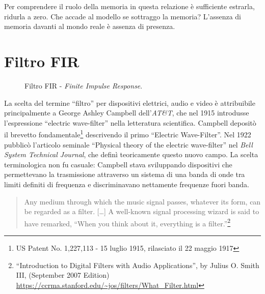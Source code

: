 Per comprendere il ruolo della memoria in questa relazione è sufficiente estrarla, ridurla a zero. Che accade al modello se sottraggo la memoria? L'assenza di memoria davanti al mondo reale è assenza di presenza.

\section{Filtro FIR}

\begin{figure}[htbp]
\begin{center}
\caption{Filtro FIR - \emph{Finite Impulse Response}.}
\label{slide7}
\end{center}
\end{figure}

La scelta del termine “filtro” per dispositivi elettrici, audio e video è
attribuibile principalmente a George Ashley Campbell dell'\emph{AT\&T}, che nel
1915 introdusse l'espressione “electric wave-filter” nella letteratura scientifica.
Campbell depositò il brevetto fondamentale\footnote{US Patent No. 1,227,113 - 15
luglio 1915, rilasciato il 22 maggio 1917} descrivendo il primo “Electric
Wave-Filter”. Nel 1922 pubblicò l'articolo seminale “Physical theory of the
electric wave-filter” nel \emph{Bell System Technical Journal}, che definì
teoricamente questo nuovo campo. La scelta terminologica non fu casuale:
Campbell stava sviluppando dispositivi che permettevano la trasmissione
attraverso un sistema di una banda di onde tra limiti definiti di frequenza e
discriminavano nettamente frequenze fuori banda.

\begin{quote}
  \begin{sf}
    \small
    Any medium through which the music signal passes, whatever its form, can be
    regarded as a filter. [\ldots] A well-known signal processing wizard is said
    to have remarked, “When you think about it, everything is a filter.”\footnote{
    “Introduction to Digital Filters with Audio Applications”, by Julius O.
    Smith III, (September 2007 Edition)
    \url{https://ccrma.stanford.edu/~jos/filters/What_Filter.html}
    }
  \end{sf}
\end{quote}

